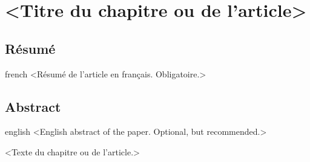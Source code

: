 \chapter{<Titre du chapitre ou de l'article>}     %
\label{chap:}                   %

\section{Résumé}

\begin{otherlanguage*}{french}
  <Résumé de l'article en français. Obligatoire.>
\end{otherlanguage*}

\section{Abstract}

\begin{otherlanguage*}{english}
  <English abstract of the paper. Optional, but recommended.>
\end{otherlanguage*}

<Texte du chapitre ou de l'article.>

